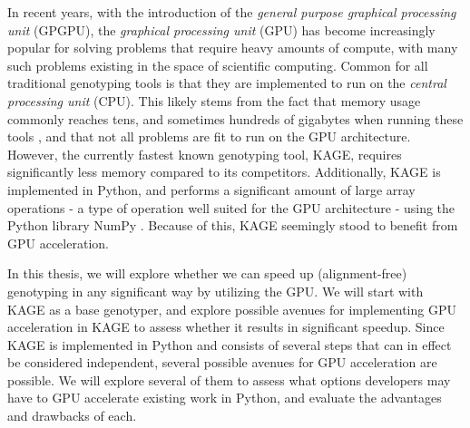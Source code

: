 In recent years, with the introduction of the \textit{general purpose graphical processing unit} (GPGPU), the \textit{graphical processing unit} (GPU) has become increasingly popular for solving problems that require heavy amounts of compute, with many such problems existing in the space of scientific computing.
Common for all traditional genotyping tools is that they are implemented to run on the \textit{central processing unit} (CPU).
This likely stems from the fact that memory usage commonly reaches tens, and sometimes hundreds of gigabytes when running these tools \cite{kage}, and that not all problems are fit to run on the GPU architecture.
However, the currently fastest known genotyping tool, KAGE, requires significantly less memory compared to its competitors.
Additionally, KAGE is implemented in Python, and performs a significant amount of large array operations - a type of operation well suited for the GPU architecture - using the Python library NumPy \cite{numpy}.
Because of this, KAGE seemingly stood to benefit from GPU acceleration.

In this thesis, we will explore whether we can speed up (alignment-free) genotyping in any significant way by utilizing the GPU.
We will start with KAGE as a base genotyper, and explore possible avenues for implementing GPU acceleration in KAGE to assess whether it results in significant speedup.
Since KAGE is implemented in Python and consists of several steps that can in effect be considered independent, several possible avenues for GPU acceleration are possible.
We will explore several of them to assess what options developers may have to GPU accelerate existing work in Python, and evaluate the advantages and drawbacks of each.

